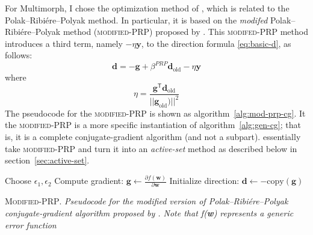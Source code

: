 For Multimorph, I chose the optimization method of \citet{cheng-and-li:2012}, which is related to the Polak--Ribi\'{e}re--Polyak  method. In particular, it is based on the \emph{modifed} Polak--Ribi\'{e}re--Polyak method (\textsc{modified-PRP})  proposed by \citet{zhang-et-al:2006}. This \textsc{modifed-PRP} method
introduces a third term, namely  $-\eta \textbf{y}$, to the direction formula \eqref{eq:basic-d}, as follows:
\begin{equation}\label{eq:mod-d-update}
\textbf{d} = -\textbf{g}  + \beta^{PRP} \textbf{d}_{\text{old}} - \eta \textbf{y}
\end{equation}
where 
\begin{equation}
\label{eq:eta}
\eta = \frac{\textbf{g}^{\textsf{T}}\textbf{d}_{\text{old}}}{{||\textbf{g}_{\text{old}})||}^2}
\end{equation}
The pseudocode for the \textsc{modified-PRP} is shown as algorithm~\ref{alg:mod-prp-cg}. It the \textsc{modified-PRP} is a more specific instantiation of algorithm~\ref{alg:gen-cg}; that is, it is a complete conjugate-gradient algorithm (and not a subpart).\citet{cheng-and-li:2012} essentially take \textsc{modified-PRP} and turn it into an \emph{active-set} method as described below in section~\ref{sec:active-set}.
\begin{algorithm}[t]
	 Choose $\epsilon_1, \epsilon_2$\;
 Compute gradient: $\textbf{g} \gets \frac{\partial f(\mathbf{w})}{\partial \mathbf{w}} $\;
 Initialize direction: $\mathbf{d} \gets -\text{copy}(\textbf{g})$\; \label{line:init-d-2}
\caption{\textsc{Modified-PRP}. \textit{Pseudocode for the modified version of Polak--Ribi\'{e}re--Polyak conjugate-gradient algorithm proposed by \citet{zhang-et-al:2006}. Note that f(\textbf{w}) represents a generic error function} }%
\label{alg:mod-prp-cg}
\end{algorithm}


